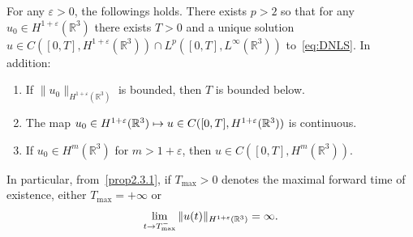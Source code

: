 \documentclass[AHL,Unicode,longabstracts,published]{cedram}
\newcommand*\R{\mathbb{R}}
\newcommand*\eps{\varepsilon}
\renewcommand*{\to}{\mathchoice{\longrightarrow}{\rightarrow}{\rightarrow}{\rightarrow}}
\let\oldmapsto\mapsto
\renewcommand*{\mapsto}{\mathchoice{\longmapsto}{\oldmapsto}{\oldmapsto}{\oldmapsto}}
\begin{document}
\begin{prop}\label{prpLocExsCubic}
For any $\eps >0$, the followings holds.
There exists $p>2$ so that for any $u_0 \in H^{1+\eps} (\R^3)$ there exists $T>0$ and a unique solution $u \in C([0,T],H^{1 + \eps}(\R^3)) \cap L^p([0, T], L^\infty(\R^3))$ to~\eqref{eq:DNLS}. In addition:
\begin{enumerate}
\item\label{prop2.3.1} If $\| u_0 \|_{H^{1+\eps}(\R^3)}$ is bounded, then $T$ is bounded below.
\item\label{prop2.3.2} The map $u_0 \in H^{1+\eps}(\R^3) \mapsto u \in C([0,T],H^{1+\eps}(\R^3))$ is continuous.
\item\label{prop2.3.3} If $u_0 \in H^m(\R^3)$ for $m>{1+\eps}$, then $u \in C([0, T], H^m(\R^3))$.
\end{enumerate}
In particular, from~\eqref{prop2.3.1}, if $T_{\max} >0$ denotes the maximal forward time of existence, either $T_{\max} = +\infty$ or
\begin{equation}\label{eqBUAlt}
\lim_{t \to T_{\max}^-}\| u (t) \|_{H^{{1+\eps}}(\R^3)} = \infty.
\end{equation}
\end{prop}
\end{document}
